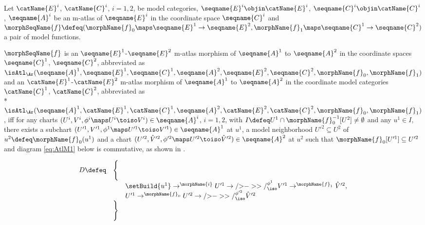 \documentclass{article}
\begin{document}
\begin{definition}
\label{def:M-ATLmorph}
Let $\catName{E}^i$, $\catName{C}^i$, $i=1,2$, be model categories,
$\seqname{E}^i \objin \catName{E}^i$,
$\seqname{C}^i \objin \catName{C}^i$, $\seqname{A}^i$ be an m-atlas of
$\seqname{E}^i$ in the coordinate space $\seqname{C}^i$ and
$
  \morphSeqName{f} \defeq
  (
    \morphName{f}_0 \maps \seqname{E}^1 \to \seqname{E}^2,
    \morphName{f}_1 \maps \seqname{C}^1 \to \seqname{C}^2
  )
$
a pair of model functions.

$\morphSeqName{f}$ is an
$\seqname{E}^1$-$\seqname{E}^2$ m-atlas morphism of $\seqname{A}^1$ to
$\seqname{A}^2$ in the coordinate spaces $\seqname{C}^1$,
$\seqname{C}^2$, abbreviated as
$
  \isAtl_\Ar
    (
      \seqname{A}^1,
      \seqname{E}^1,
      \seqname{C}^1,
      \seqname{A}^2,
      \seqname{E}^2,
      \seqname{C}^2,
      \morphName{f}_0,
      \morphName{f}_1
    )
$
and an $\catName{E}^1$-$\catName{E}^2$ m-atlas morphism of
$\seqname{A}^1$ to $\seqname{A}^2$ in the coordinate model categories
$\catName{C}^1$, $\catName{C}^2$, abbreviated as \\*
$
  \isAtl_\Ar
  (
    \seqname{A}^1,
    \catName{E}^1,
    \catName{C}^1,
    \seqname{A}^2,
    \catName{E}^2,
    \catName{C}^2,
    \morphName{f}_0,
    \morphName{f}_1
  )
$,
iff for any charts
$(U^i, V^i, \phi^i \maps U^i \toiso V^i) \in \seqname{A}^i$, $i=1,2$,
with $I \defeq U^1 \cap \morphName{f}^{-1}_0[U^2] \neq \emptyset$ and any
$u^1 \in I$, there exists a subchart
$
  (U'^1, V'^1, \phi^1 \maps U'^1 \toiso V'^1)
  \in \seqname{A}^1
$
at $u^1$, a model neighborhood $U'^2 \subseteq U^2$ of
$u^2 \defeq \morphName{f}_0(u^1)$ and a chart
$
  (U'^2 ,\hat{V}'^2, \phi'^2 \maps U'^2 \toiso \hat{V}'^2)
  \in \seqname{A}^2
$
at $u^2$ such that
$\morphName{f}_0[U'^1] \subseteq U'^2$ and diagram \eqref{eq:AtlM1}
below is commutative, as shown in .

\begin{equation}
\begin{array}{lll}
\label{eq:AtlM1}
D \defeq & \Biggl \{
\\
  &&
  \setBuild{u^1} \to^{\morphName{i}} U'^1
  \to/{>}->>/^{\phi^1}_\iso V'^1
  \to^{\morphName{f}_1} \hat{V}'^2,
\\
  &&
  U'^1 \to^{\morphName{f}_0}  U'^2 \to/{>}->>/^{\phi'^2}_\iso \hat{V}'^2
\\
& \Biggr \}
\end{array}
\end{equation}


\end{definition}
\end{document}
